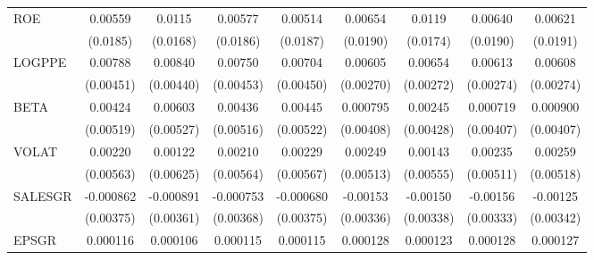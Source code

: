 \begin{table}[htbp]
\begin{tabular}{l*{8}{c}}
ROE                 &     0.00559         &      0.0115         &     0.00577         &     0.00514         &     0.00654         &      0.0119         &     0.00640         &     0.00621         \\
                    &    (0.0185)         &    (0.0168)         &    (0.0186)         &    (0.0187)         &    (0.0190)         &    (0.0174)         &    (0.0190)         &    (0.0191)         \\
LOGPPE              &     0.00788\sym{*}  &     0.00840\sym{*}  &     0.00750         &     0.00704         &     0.00605\sym{**} &     0.00654\sym{**} &     0.00613\sym{**} &     0.00608\sym{**} \\
                    &   (0.00451)         &   (0.00440)         &   (0.00453)         &   (0.00450)         &   (0.00270)         &   (0.00272)         &   (0.00274)         &   (0.00274)         \\
BETA                &     0.00424         &     0.00603         &     0.00436         &     0.00445         &    0.000795         &     0.00245         &    0.000719         &    0.000900         \\
                    &   (0.00519)         &   (0.00527)         &   (0.00516)         &   (0.00522)         &   (0.00408)         &   (0.00428)         &   (0.00407)         &   (0.00407)         \\
VOLAT               &     0.00220         &     0.00122         &     0.00210         &     0.00229         &     0.00249         &     0.00143         &     0.00235         &     0.00259         \\
                    &   (0.00563)         &   (0.00625)         &   (0.00564)         &   (0.00567)         &   (0.00513)         &   (0.00555)         &   (0.00511)         &   (0.00518)         \\
SALESGR             &   -0.000862         &   -0.000891         &   -0.000753         &   -0.000680         &    -0.00153         &    -0.00150         &    -0.00156         &    -0.00125         \\
                    &   (0.00375)         &   (0.00361)         &   (0.00368)         &   (0.00375)         &   (0.00336)         &   (0.00338)         &   (0.00333)         &   (0.00342)         \\
EPSGR               &    0.000116         &    0.000106         &    0.000115         &    0.000115         &    0.000128\sym{*}  &    0.000123\sym{*}  &    0.000128\sym{*}  &    0.000127\sym{*}  \\

\end{tabular}
\end{table}
